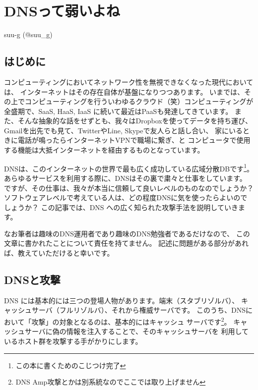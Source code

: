 
\chapter{DNSって弱いよね}

\begin{flushright}
 {\headfont suu-g (@suu\_g)}
\end{flushright}

\section{はじめに}

コンピューティングにおいてネットワーク性を無視できなくなった現代においては、
インターネットはその存在自体が基盤になりつつあります。
いまでは、その上でコンピューティングを行ういわゆるクラウド（笑）コンピューティングが
全盛期で、SaaS, HaaS, IaaS に続いて最近はPaaSも発達してきています。
また、そんな抽象的な話をせずとも、我々はDropboxを使ってデータを持ち運び、
Gmailを出先でも見て、TwitterやLine, Skypeで友人らと話し合い、
家にいるときに電話が鳴ったらインターネットVPNで職場に繋ぎ、と
コンピュータで使用する機能は大抵インターネットを経由するものとなっています。

DNSは、このインターネットの世界で最も広く成功している広域分散DBです\footnote{この本に書くためのこじつけ完了}。
あらゆるサービスを利用する際に、DNSはその裏で粛々と仕事をしています。
ですが、その仕事は、我々が本当に信頼して良いレベルのものなのでしょうか？
ソフトウェアレベルで考えている人は、どの程度DNSに気を使ったらよいのでしょうか？
この記事では、DNS への広く知られた攻撃手法を説明していきます。

なお筆者は趣味のDNS運用者であり趣味のDNS勉強者であるだけなので、
この文章に書かれたことについて責任を持てません。
記述に問題がある部分があれば、教えていただけると幸いです。

\section{DNSと攻撃}

DNS には基本的には三つの登場人物があります。端末（スタブリゾルバ）、
キャッシュサーバ（フルリゾルバ）、それから権威サーバです。
このうち、DNSにおいて「攻撃」の対象となるのは、基本的にはキャッシュ
サーバです\footnote{DNS Amp攻撃とかは別系統なのでここでは取り上げません}。
キャッシュサーバに偽の情報を注入することで、そのキャッシュサーバを
利用しているホスト群を攻撃する手がかりにします。


